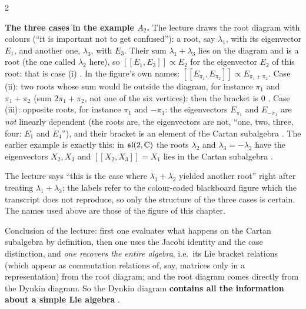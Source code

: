 \begin{paracol}{2}
\begin{coursenote}
\end{coursenote}
\textbf{The three cases in the example $A_2$.} The lecture draws the root diagram with colours (``it is important not to get confused''): a root, say $\lambda_1$, with its eigenvector $E_1$, and another one, $\lambda_3$, with $E_3$. Their sum $\lambda_1+\lambda_3$ lies on the diagram and is a root (the one called $\lambda_2$ here), so $[\![E_1,E_3]\!]\propto E_2$ for the eigenvector $E_2$ of this root: that is case (i)         . In the figure's own names: $[\![E_{\pi_1},E_{\pi_2}]\!]\propto E_{\pi_1+\pi_2}$. Case (ii): two roots whose sum would lie outside the diagram, for instance $\pi_1$ and $\pi_1+\pi_2$ (sum $2\pi_1+\pi_2$, not one of the six vertices): then the bracket is $0$   . Case (iii): opposite roots, for instance $\pi_1$ and $-\pi_1$: the eigenvectors $E_{\pi_1}$ and $E_{-\pi_1}$ are \emph{not} linearly dependent (the roots are, the eigenvectors are not, ``one, two, three, four: $E_1$ and $E_4$''), and their bracket is an element of the Cartan subalgebra   . The earlier example is exactly this: in $\mathfrak{sl}(2,\mathbb{C})$ the roots $\lambda_2$ and $\lambda_3=-\lambda_2$ have the eigenvectors $X_2,X_3$ and $[\![X_2,X_3]\!]=X_1$ lies in the Cartan subalgebra   .
\begin{coursenote}
The lecture says ``this is the case where $\lambda_1+\lambda_2$ yielded another root'' right after treating $\lambda_1+\lambda_3$; the labels refer to the colour-coded blackboard figure which the transcript does not reproduce, so only the structure of the three cases is certain. The names used above are those of the figure of this chapter.  
\end{coursenote}
Conclusion of the lecture: first one evaluates what happens on the Cartan subalgebra by definition, then one uses the Jacobi identity and the case distinction, and \emph{one recovers the entire algebra}, i.e.\ its Lie bracket relations (which appear as commutation relations of, say, matrices only in a representation) from the root diagram; and the root diagram comes directly from the Dynkin diagram. So the Dynkin diagram \textbf{contains all the information about a simple Lie algebra}   .


\end{paracol}
